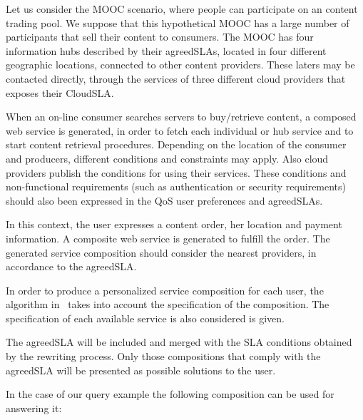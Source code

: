 Let us consider the MOOC scenario, where people can participate on an content trading pool.
We suppose that this hypothetical MOOC has a large number of participants that sell their content  to  consumers. 
The MOOC has four information hubs described by their agreedSLAs, located in four different geographic locations, connected to other content providers.
These laters may be  contacted directly, through the services of three different cloud providers that exposes their CloudSLA.
 
  

When an on-line consumer searches servers to buy/retrieve content, a composed web service is generated, in order to fetch each individual or hub service and to start  content retrieval procedures.
Depending on the location of the consumer and producers, different conditions and constraints may apply.
Also  cloud providers  publish the conditions for using their services.
These conditions and non-functional requirements (such as authentication or security requirements) should also been expressed in the QoS user preferences and agreedSLAs.

In this context, the user  expresses a content order, her location and payment information. A composite web service is  generated to fulfill the order.
The generated service composition should consider the nearest providers, in accordance to the agreedSLA.

In order to produce a personalized service composition for each user, the algorithm in~\cite{CostaAMR13} takes into account the specification of the composition. The specification of each available service is also considered is given. 

 

The agreedSLA will be included and merged with the SLA conditions obtained by the rewriting process. Only those compositions that comply with the agreedSLA will be presented as possible solutions to the user.
 

In the case of our query example the following composition can be used for answering it:

